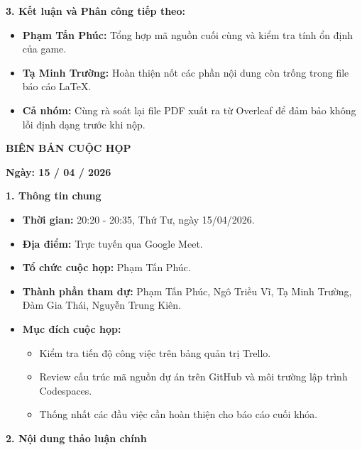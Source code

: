 \documentclass[12pt,a4paper]{article}
\begin{document}
\vspace{2pt}
\textbf{3. Kết luận và Phân công tiếp theo:}
\begin{itemize}
    \item \textbf{Phạm Tấn Phúc:} Tổng hợp mã nguồn cuối cùng và kiểm tra tính ổn định của game.
    \item \textbf{Tạ Minh Trường:} Hoàn thiện nốt các phần nội dung còn trống trong file báo cáo LaTeX.
    \item \textbf{Cả nhóm:} Cùng rà soát lại file PDF xuất ra từ Overleaf để đảm bảo không lỗi định dạng trước khi nộp.
\end{itemize}

\newpage

\begin{center}
    {\large\bfseries BIÊN BẢN CUỘC HỌP}
\end{center}
\begin{center}
    \textbf{Ngày: 15 / 04 / 2026}
\end{center}
\vspace{0.4em}

\textbf{1. Thông tin chung}
\begin{itemize}
    \item \textbf{Thời gian:} 20:20 - 20:35, Thứ Tư, ngày 15/04/2026.
    \item \textbf{Địa điểm:} Trực tuyến qua Google Meet.
    \item \textbf{Tổ chức cuộc họp:} Phạm Tấn Phúc.
    \item \textbf{Thành phần tham dự:} Phạm Tấn Phúc, Ngô Triều Vĩ, Tạ Minh Trường, Đàm Gia Thái, Nguyễn Trung Kiên.
    \item \textbf{Mục đích cuộc họp:}
    \begin{itemize}
        \item Kiểm tra tiến độ công việc trên bảng quản trị Trello.
        \item Review cấu trúc mã nguồn dự án trên GitHub và môi trường lập trình Codespaces.
        \item Thống nhất các đầu việc cần hoàn thiện cho báo cáo cuối khóa.
    \end{itemize}
\end{itemize}

\vspace{4pt}
\textbf{2. Nội dung thảo luận chính}
\end{document}
